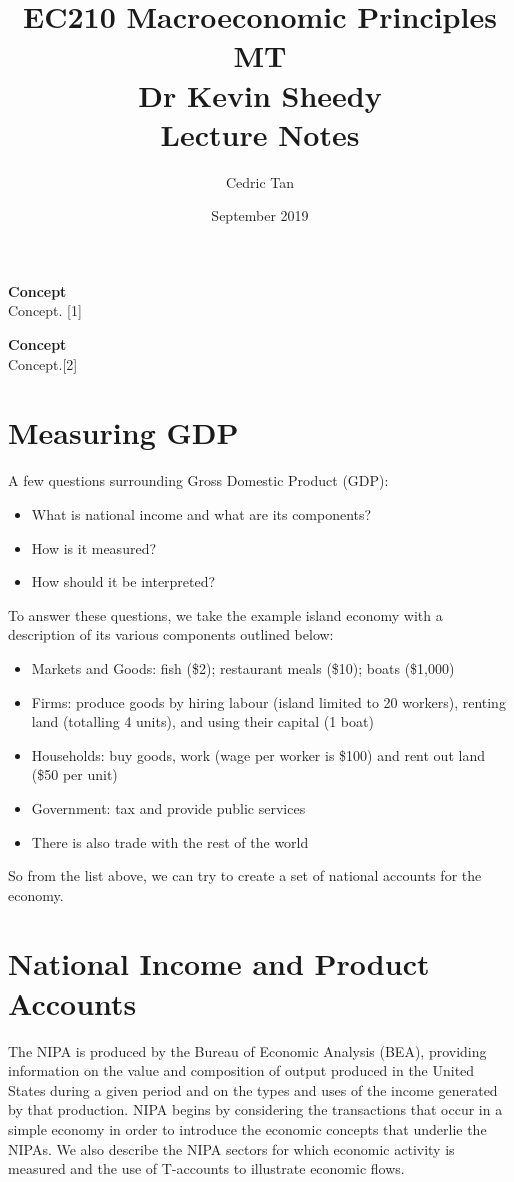 \documentclass[12pt, letterpaper]{article}
\title{
	{EC210 Macroeconomic Principles MT}\\
	{\large{Dr Kevin Sheedy}}\\
	{\large{Lecture Notes}}
}
\author{Cedric Tan}
\date{September 2019}
\begin{document}
\maketitle
{\small
  \noindent\textbf{Concept}\\
  Concept. \hspace*{\fill}[1]

  \vspace{10pt}
  \noindent\textbf{Concept}\\
  Concept.\hspace*{\fill}[2]

\newpage
\tableofcontents
\newpage

\section{Measuring GDP}
A few questions surrounding Gross Domestic Product (GDP):
\begin{itemize}
	\item What is national income and what are its components?
	\item How is it measured?
	\item How should it be interpreted?
\end{itemize}
To answer these questions, we take the example island economy with a description of its various components outlined below:
\begin{itemize}
	\item Markets and Goods: fish (\$2); restaurant meals (\$10); boats (\$1,000)
	\item Firms: produce goods by hiring labour (island limited to 20 workers), renting land (totalling 4 units), and using their capital (1 boat)
	\item Households: buy goods, work (wage per worker is \$100) and rent out land (\$50 per unit)
	\item Government: tax and provide public services
	\item There is also trade with the rest of the world
\end{itemize}
So from the list above, we can try to create a set of national accounts for the economy.



\section{National Income and Product Accounts}
The NIPA is produced by the Bureau of Economic Analysis (BEA), providing information on the value and composition of output produced in the United States during a given period and on the types and uses of the income generated by that production. NIPA begins by considering the transactions that occur in a simple economy in order to introduce the economic concepts that underlie the NIPAs. We also describe the NIPA sectors for which economic activity is measured and the use of T-accounts to illustrate economic flows.

}
\end{document}
